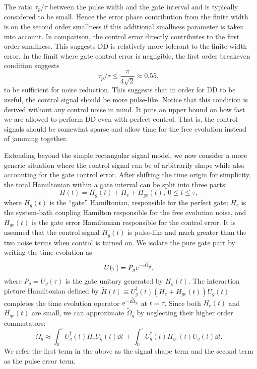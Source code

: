 \documentclass[b5paper,11pt]{article}
\newcommand{\wt}[1]{\widetilde{#1}}
\begin{document}
The ratio $\tau_p/\tau$ between the pulse width and the gate interval and is typically considered to be small. Hence the error phase contribution from the finite width is on the second order smallness if this additional smallness parameter is taken into account. In comparison,
the control error directly contributes to the first order smallness. 
This suggests DD is relatively more tolerant to the finite width error.
In the limit where gate control error is negligible, the first order breakeven condition suggests
\begin{equation}
 \tau_p/\tau \le \frac{\pi}{4\sqrt{2}}\approx 0.55,
\end{equation}
to be sufficient for noise reduction. 
This suggests that in order for DD to be useful, the control signal should be more pulse-like. Notice that this condition is derived without any control noise in mind. It puts an upper bound on how 
fast we are allowed to perform DD even with perfect control. That is, the 
control signals should be somewhat sparse and allow time for the free evolution instead of jamming together.


Extending beyond the simple rectangular signal model, we now consider a more generic situation where the control signal can be of arbitrarily shape while also accounting for the gate control error. After shifting the time origin for simplicity, the total Hamiltonian within a gate interval can be split into three parts:
\begin{equation}\label{eq:Hami-3parts}
 H(t)= H_g(t) +  H_e +  H_{ge}(t), \ 0\le t\le \tau,
\end{equation}
where $H_g(t)$ is the ``gate'' Hamiltonian, responsible for the perfect gate; 
$H_e$ is the system-bath coupling Hamilton responsible for the free evolution noise,
and $H_{ge}(t)$ is the gate error Hamiltonian responsible for the control error. It is assumed that the control signal $H_g(t)$ is pulse-like and much greater than the two noise terms when control is turned on.
We isolate the pure gate part by writing the time evolution as 
\begin{equation}
 U(\tau)=P_g \upe^{-\upi \wt \Omega_g},
\end{equation}
 where $P_g=U_g(\tau)$ is the gate unitary generated by $H_g(t)$.
The interaction picture Hamiltonian defined by
$\wt H(t)\equiv U_g^\dagger(t) (H_e + H_{ge} (t)) U_g(t)$ completes the time evolution operator $\upe^{-\upi \wt \Omega_g}$
at $t=\tau$. 
Since both $H_e(t)$ and $H_{ge}(t)$ are small, we can approximate $\wt \Omega_g$ by neglecting their higher order commutators:
\begin{equation}
 \wt \Omega_g \approx\! \int_0^\tau\!\! U_g^\dagger(t) H_e U_g(t) \dd t\, + \! \int_0^\tau\!\! U_g^\dagger(t) H_{ge}(t) U_g(t) \dd t.
\end{equation} 
We refer the first term in the above as the signal shape term and the second term as the pulse error term. 
\end{document}
